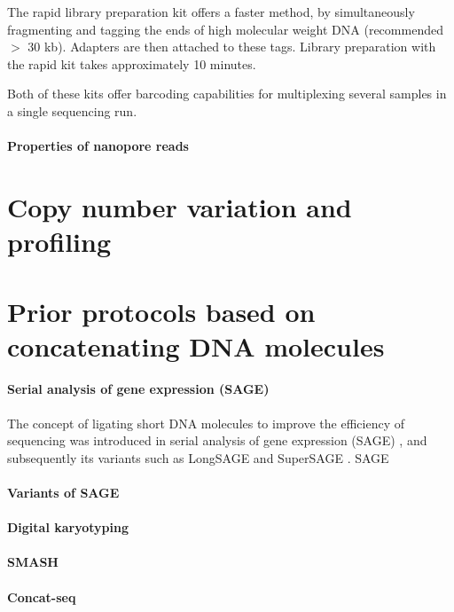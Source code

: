 The rapid library preparation kit offers a faster method, by
simultaneously fragmenting and tagging the ends of high molecular weight DNA
(recommended $>$ 30 kb). Adapters are then attached to these tags.
Library preparation with the rapid kit takes approximately 10 minutes.

Both of these kits offer barcoding capabilities for multiplexing several
samples in a single sequencing run.






\paragraph{Properties of nanopore reads}



\section{Copy number variation and profiling}


\section{Prior protocols based on concatenating DNA molecules}
\paragraph{Serial analysis of gene expression (SAGE)}
The concept of ligating short DNA molecules to improve the efficiency
of sequencing was introduced in serial analysis of gene expression
(SAGE) \citep{}, and subsequently its variants such as LongSAGE and
SuperSAGE \citep{}. SAGE

\paragraph{Variants of SAGE}

\paragraph{Digital karyotyping}

\paragraph{SMASH}

\paragraph{Concat-seq}

